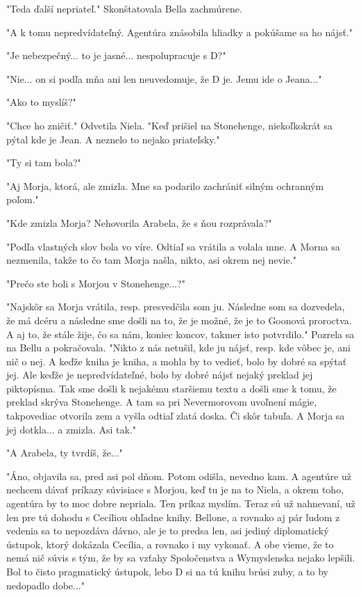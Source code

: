 \documentclass{book}
\begin{document}
"$ $Teda ďalší nepriateľ."$ $  Skonštatovala Bella zachmúrene.

"$ $A k tomu nepredvídateľný. Agentúra znásobila hliadky a pokúšame sa ho nájsť."$ $ 

"$ $Je nebezpečný... to je jasné... nespolupracuje s D?"$ $ 

"$ $Nie... on si podľa mňa ani len neuvedomuje, že D je. Jemu ide o Jeana..."$ $ 

"$ $Ako to myslíš?"$ $ 

"$ $Chce ho zničiť."$ $  Odvetila Niela. "$ $Keď prišiel na Stonehenge, niekoľkokrát sa pýtal kde je Jean. A neznelo to nejako priateľsky."$ $ 

"$ $Ty si tam bola?"$ $ 

"$ $Aj Morja, ktorá, ale zmizla. Mne sa podarilo zachrániť silným ochranným poľom."$ $ 

"$ $Kde zmizla Morja? Nehovorila Arabela, že s ňou rozprávala?"$ $ 

"$ $Podľa vlastných slov bola vo víre. Odtiaľ sa vrátila a volala mne. A Morna sa nezmenila, takže to čo tam Morja našla, nikto, asi okrem nej nevie."$ $ 

"$ $Prečo ste boli s Morjou v Stonehenge...?"$ $ 

"$ $Najskôr sa Morja vrátila, resp. presvedčila som ju. Následne som sa dozvedela, že má dcéru a následne sme došli na to, že je možné, že je to Goonová proroctva. A aj to, že stále žije, čo sa nám, koniec koncov, takmer isto potvrdilo."$ $  Pozrela sa na Bellu a pokračovala. "$ $Nikto z nás netušil, kde ju nájsť, resp. kde vôbec je, ani nič o nej. A keďže kniha je kniha, a mohla by to vedieť, bolo by dobré sa spýtať jej. Ale keďže je nepredvídateľné, bolo by dobré nájsť nejaký preklad jej piktopísma. Tak sme došli k nejakému staršiemu textu a došli sme k tomu, že preklad skrýva Stonehenge. A tam sa pri Nevermorovom uvoľnení mágie, takpovediac otvorila zem a vyšla odtiaľ zlatá doska. Či skôr tabuľa. A Morja sa jej dotkla... a zmizla. Asi tak."$ $ 

"$ $A Arabela, ty tvrdíš, že..."$ $ 

"$ $Áno, objavila sa, pred asi pol dňom. Potom odišla, nevedno kam. A agentúre už nechcem dávať príkazy súvisiace s Morjou, keď tu je na to Niela, a okrem toho, agentúra by to moc dobre nepriala. Ten príkaz myslím. Teraz sú už nahnevaní, už len pre tú dohodu s Cecíliou ohľadne knihy. Bellone, a rovnako aj pár ľudom z vedenia sa to nepozdáva dávno, ale je to predsa len, asi jediný diplomatický ústupok, ktorý dokázala Cecília, a rovnako i my vykonať. A obe vieme, že to nemá nič súvis s tým, že by sa vzťahy Spoločenstva a Wymyslenska nejako lepšili. Bol to čisto pragmatický ústupok, lebo D si na tú knihu brúsi zuby, a to by nedopadlo dobe..."$ $ 
\end{document}
